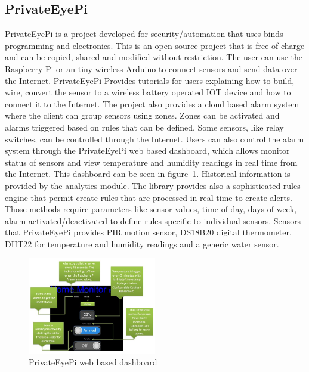 \documentclass{acm_proc_article-sp}
\begin{document}
\subsection{PrivateEyePi}
PrivateEyePi\cite{Privateeyepi} is a project developed for security/automation that uses binds programming and electronics. This is an open source project that is free of charge and can be copied, shared and modified without restriction. The user can use the Raspberry Pi or an tiny wireless Arduino to connect sensors and send data over the Internet.
\newline
\newline
PrivateEyePi Provides tutorials for users explaining how to build, wire, convert the sensor to a wireless battery operated IOT device and how to connect it to the Internet. The project also provides a cloud based alarm system where the client can group sensors using zones. Zones can be activated and alarms triggered based on rules that can be defined.
\newline
\newline
Some sensors, like relay switches, can be controlled through the Internet. Users can also control the alarm system through the PrivateEyePi web based dashboard, which allows monitor status of sensors and view temperature and humidity readings in real time from the Internet. This dashboard can be seen in figure~\ref{fig:PrivateEye}.
\newline
\newline
 Historical information is provided by the analytics module. The library provides also a sophisticated rules engine that permit create rules that are processed in real time to create alerts. Those methods require parameters like sensor values, time of day, days of week, alarm activated/deactivated to define rules specific to individual sensors.     
Sensors that PrivateEyePi provides PIR motion sensor, DS18B20 digital thermometer, DHT22 for temperature and humidity readings and a generic water sensor.
\begin{figure}[h]
\centering
    \includegraphics[width=0.5\textwidth,natwidth=610,natheight=642]{pictures/dashboardPrivateeye.png}
    \caption{PrivateEyePi web based dashboard\protect\cite{Privateeyepi}}
    \label{fig:PrivateEye}
\end{figure}
\end{document}
